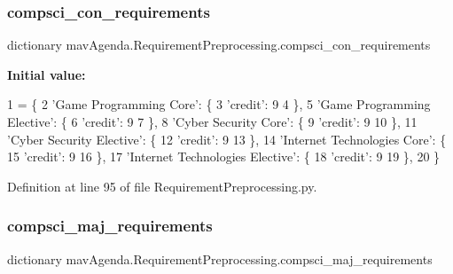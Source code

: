 \mbox{\label{namespacemavAgenda_1_1RequirementPreprocessing_a1d35efe669305d75d4f7fb75b546a5f4}} 
\subsubsection{\texorpdfstring{compsci\+\_\+con\+\_\+requirements}{compsci\_con\_requirements}}
{\footnotesize\ttfamily dictionary mav\+Agenda.\+Requirement\+Preprocessing.\+compsci\+\_\+con\+\_\+requirements}

{\bfseries Initial value\+:}
\begin{DoxyCode}
1 =  \{
2     \textcolor{stringliteral}{'Game Programming Core'}: \{
3         \textcolor{stringliteral}{'credit'}: 9
4     \},
5     \textcolor{stringliteral}{'Game Programming Elective'}: \{
6         \textcolor{stringliteral}{'credit'}: 9
7     \},
8     \textcolor{stringliteral}{'Cyber Security Core'}: \{
9         \textcolor{stringliteral}{'credit'}: 9
10     \},
11     \textcolor{stringliteral}{'Cyber Security Elective'}: \{
12         \textcolor{stringliteral}{'credit'}: 9
13     \},
14     \textcolor{stringliteral}{'Internet Technologies Core'}: \{
15         \textcolor{stringliteral}{'credit'}: 9
16     \},
17     \textcolor{stringliteral}{'Internet Technologies Elective'}: \{
18         \textcolor{stringliteral}{'credit'}: 9
19     \},
20 \}
\end{DoxyCode}


Definition at line 95 of file Requirement\+Preprocessing.\+py.

\mbox{\label{namespacemavAgenda_1_1RequirementPreprocessing_a1c7ad9a1d23fb567c61aa4db3c9166df}} 
\subsubsection{\texorpdfstring{compsci\+\_\+maj\+\_\+requirements}{compsci\_maj\_requirements}}
{\footnotesize\ttfamily dictionary mav\+Agenda.\+Requirement\+Preprocessing.\+compsci\+\_\+maj\+\_\+requirements}

